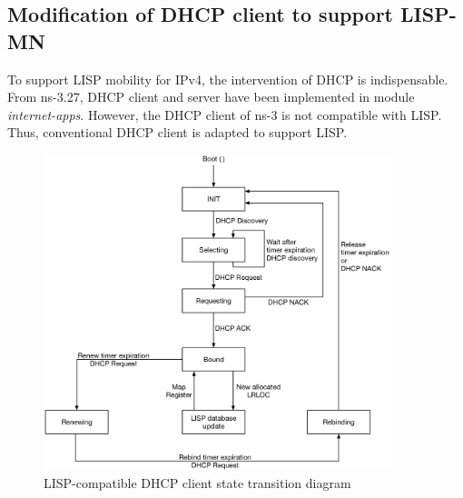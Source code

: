 \subsection{Modification of DHCP client to support LISP-MN}
\label{subsec:DHCP}
To support LISP mobility for IPv4, the intervention of DHCP is indispensable. From ns-3.27, DHCP client and server have been implemented in module \emph{internet-apps}. However, the DHCP client of ns-3 is not compatible with LISP. Thus, conventional DHCP client is adapted to support LISP.
\begin{figure}[!t]
	\centering
	\includegraphics[width=0.9\textwidth]{Pics/DHCP_transition_state.eps}
	\caption{LISP-compatible DHCP client state transition diagram}
	\label{fig:DHCP-state-transition}
\end{figure}
